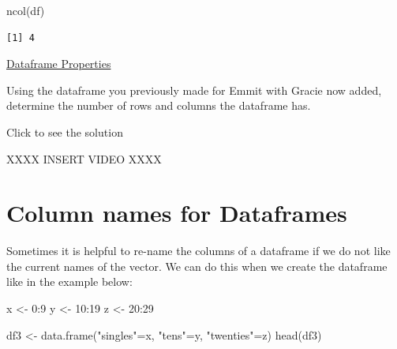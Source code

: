\documentclass[
  letterpaper,
  DIV=11,
  numbers=noendperiod]{scrreprt}
\newenvironment{Shaded}{\begin{snugshade}}{\end{snugshade}}
\newcommand{\DecValTok}[1]{\textcolor[rgb]{0.68,0.00,0.00}{#1}}
\newcommand{\FunctionTok}[1]{\textcolor[rgb]{0.28,0.35,0.67}{#1}}
\newcommand{\NormalTok}[1]{\textcolor[rgb]{0.00,0.23,0.31}{#1}}
\newcommand{\OtherTok}[1]{\textcolor[rgb]{0.00,0.23,0.31}{#1}}
\newcommand{\SpecialCharTok}[1]{\textcolor[rgb]{0.37,0.37,0.37}{#1}}
\newcommand{\StringTok}[1]{\textcolor[rgb]{0.13,0.47,0.30}{#1}}
\begin{document}
\begin{Shaded}
\begin{Highlighting}[]
\FunctionTok{ncol}\NormalTok{(df)}
\end{Highlighting}
\end{Shaded}

\begin{verbatim}
[1] 4
\end{verbatim}

\begin{watch}{}{}
    \href{https://youtu.be/fYxmRUeK4qw}{Dataframe Properties}
\end{watch}

\begin{tcolorbox}[enhanced jigsaw, colframe=quarto-callout-tip-color-frame, colback=white, breakable, rightrule=.15mm, title=\textcolor{quarto-callout-tip-color}{\faLightbulb}\hspace{0.5em}{Try it Out}, bottomtitle=1mm, toptitle=1mm, titlerule=0mm, left=2mm, coltitle=black, colbacktitle=quarto-callout-tip-color!10!white, leftrule=.75mm, opacitybacktitle=0.6, bottomrule=.15mm, opacityback=0, arc=.35mm, toprule=.15mm]

Using the dataframe you previously made for Emmit with Gracie now added,
determine the number of rows and columns the dataframe has.

Click to see the solution

XXXX INSERT VIDEO XXXX

\end{tcolorbox}

\section{Column names for Dataframes}\label{column-names-for-dataframes}

Sometimes it is helpful to re-name the columns of a dataframe if we do
not like the current names of the vector. We can do this when we create
the dataframe like in the example below:

\begin{Shaded}
\begin{Highlighting}[]
\NormalTok{x }\OtherTok{\textless{}{-}} \DecValTok{0}\SpecialCharTok{:}\DecValTok{9}
\NormalTok{y }\OtherTok{\textless{}{-}} \DecValTok{10}\SpecialCharTok{:}\DecValTok{19}
\NormalTok{z }\OtherTok{\textless{}{-}} \DecValTok{20}\SpecialCharTok{:}\DecValTok{29}

\NormalTok{df3 }\OtherTok{\textless{}{-}} \FunctionTok{data.frame}\NormalTok{(}\StringTok{"singles"}\OtherTok{=}\NormalTok{x, }\StringTok{"tens"}\OtherTok{=}\NormalTok{y, }\StringTok{"twenties"}\OtherTok{=}\NormalTok{z)}
\FunctionTok{head}\NormalTok{(df3)}
\end{Highlighting}
\end{Shaded}
\end{document}
